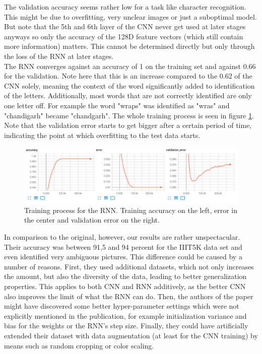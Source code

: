 \documentclass{utue} %
\begin{document}
The validation accuracy seems rather low for a task like character recognition. This might be due to overfitting, very unclear images or just a suboptimal model. But note that the 5th and 6th layer of the CNN never get used at later stages anyways so only the accuracy of the 128D feature vectors (which still contain more information) matters. This cannot be determined directly but only through the loss of the RNN at later stages. \\
The RNN converges against an accuracy of 1 on the training set and against 0.66 for the validation. Note here that this is an increase compared to the 0.62 of the CNN solely, meaning the context of the word significantly added to identification of the letters. Additionally, most words that are not correctly identified are only one letter off. For example the word "wraps" was identified as "wras" and "chandigarh" became "chandgarh".%
The whole training process is seen in figure \ref{fig:rnn_accuracy}. Note that the validation error starts to get bigger after a certain period of time, indicating the point at which overfitting to the test data starts. \\

\begin{figure}[h!]
	\centering
	\includegraphics[width=\columnwidth]{graphics/rnn_accuracy.png}
	\caption{\label{fig:rnn_accuracy} Training process for the RNN. Training accuracy on the left, error in the center and validation error on the right.}
\end{figure} 
In comparison to the original, however, our results are rather unspectacular. Their accuracy was between 91,5 and 94 percent for the IIIT5K data set and even identified very ambiguous pictures. This difference could be caused by a number of reasons. First, they used additional datasets, which not only increases the amount, but also the diversity of the data, leading to better generalization properties. This applies to both CNN and RNN additively, as the better CNN also improves the limit of what the RNN can do. Then, the authors of the paper might have discovered some better hyper-parameter settings which were not explicitly mentioned in the publication, for example initialization variance and bias for the weights or the RNN's step size. Finally, they could have artificially extended their dataset with data augmentation (at least for the CNN training) by means such as random cropping or color scaling.
\end{document}
